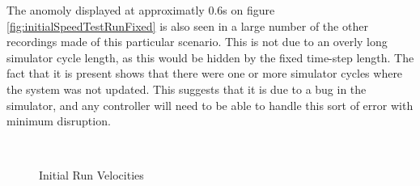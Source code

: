 \documentclass[10pt]{article}
\begin{document}
The anomoly displayed at approximatly 0.6s on figure \ref{fig:initialSpeedTestRunFixed} is also seen in a large number of the other recordings made of this particular scenario.  This is not due to an overly long simulator cycle length, as this would be hidden by the fixed time-step length.  The fact that it is present shows that there were one or more simulator cycles where the system was not updated.  This suggests that it is due to a bug in the simulator, and any controller will need to be able to handle this sort of error with minimum disruption.

\begin{figure}
 \centering
  \\
 \caption{Initial Run Velocities}
 \label{fig:initialSpeedTestRun}
\end{figure}
\end{document}
